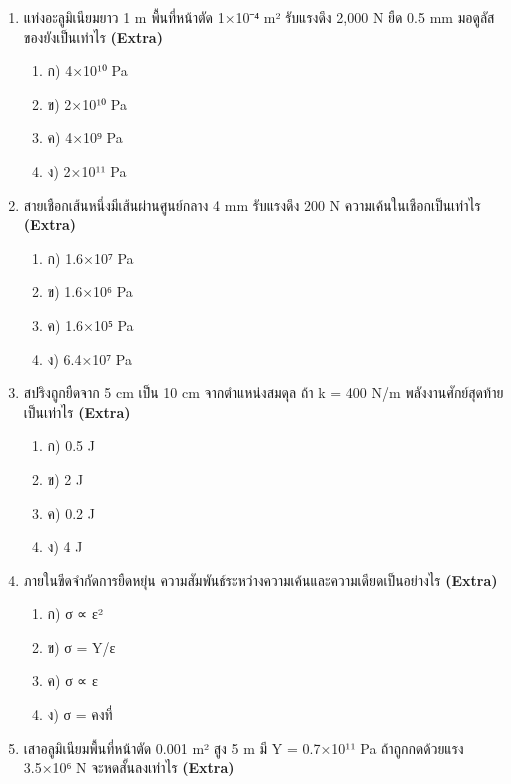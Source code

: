 \documentclass[12pt]{article}
\begin{document}
\begin{enumerate}[label=\arabic*.]
\begin{enumerate}[label=)]
\item ก) วัสดุนั้นแข็งมาก
\item ข) วัสดุนั้นสามารถรับแรงได้มากก่อนจะเกิดการเสียรูปถาวร
\item ค) วัสดุนั้นยืดได้มาก
\item ง) วัสดุนั้นเปราะ
\end{enumerate}
\item แท่งอะลูมิเนียมยาว 1 m พื้นที่หน้าตัด 1×10⁻⁴ m² รับแรงดึง 2,000 N ยืด 0.5 mm มอดูลัสของยังเป็นเท่าไร \hfill \textbf{\small (Extra)}
\begin{enumerate}[label=)]
\item ก) 4×10¹⁰ Pa
\item ข) 2×10¹⁰ Pa
\item ค) 4×10⁹ Pa
\item ง) 2×10¹¹ Pa
\end{enumerate}
\item สายเชือกเส้นหนึ่งมีเส้นผ่านศูนย์กลาง 4 mm รับแรงดึง 200 N ความเค้นในเชือกเป็นเท่าไร \hfill \textbf{\small (Extra)}
\begin{enumerate}[label=)]
\item ก) 1.6×10⁷ Pa
\item ข) 1.6×10⁶ Pa
\item ค) 1.6×10⁵ Pa
\item ง) 6.4×10⁷ Pa
\end{enumerate}
\item สปริงถูกยืดจาก 5 cm เป็น 10 cm จากตำแหน่งสมดุล ถ้า k = 400 N/m พลังงานศักย์สุดท้ายเป็นเท่าไร \hfill \textbf{\small (Extra)}
\begin{enumerate}[label=)]
\item ก) 0.5 J
\item ข) 2 J
\item ค) 0.2 J
\item ง) 4 J
\end{enumerate}
\item ภายในขีดจำกัดการยืดหยุ่น ความสัมพันธ์ระหว่างความเค้นและความเดียดเป็นอย่างไร \hfill \textbf{\small (Extra)}
\begin{enumerate}[label=)]
\item ก) σ ∝ ε²
\item ข) σ = Y/ε
\item ค) σ ∝ ε
\item ง) σ = คงที่
\end{enumerate}
\item เสาอลูมิเนียมพื้นที่หน้าตัด 0.001 m² สูง 5 m มี Y = 0.7×10¹¹ Pa ถ้าถูกกดด้วยแรง 3.5×10⁶ N จะหดสั้นลงเท่าไร \hfill \textbf{\small (Extra)}

\end{enumerate}
\end{document}
